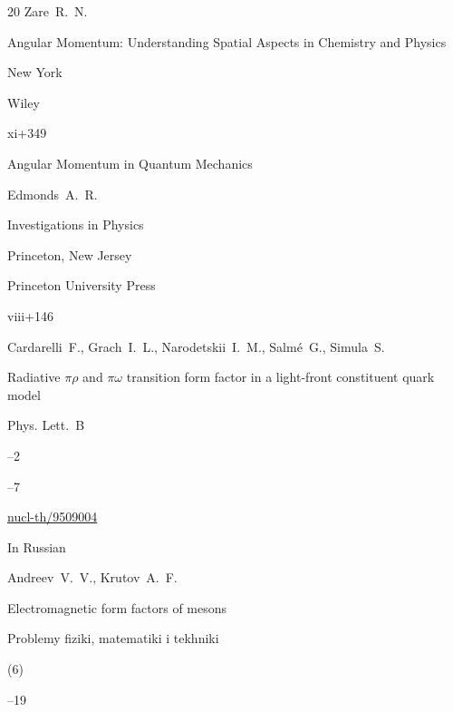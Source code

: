 \begin{thebibliography}{20}
\by Zare~R.~N.

\book Angular Momentum: Understanding Spatial Aspects in Chemistry and Physics

\publaddr New York

\publ Wiley


\totalpages xi+349




\book  Angular Momentum in Quantum Mechanics


\by Edmonds~A.~R.


\serial Investigations in Physics

\publaddr  Princeton, New Jersey

\publ Princeton University Press 

\totalpages viii+146 





\by  Cardarelli~F., Grach~I.~L., Narodetskii~I.~M., Salm\'e~G., Simula~S.

\paper    Radiative $\pi\rho$ and $\pi\omega$ transition form factor in a light-front constituent quark model

\jour Phys. Lett.~B



--2

--7


\arxiv \href{http://arxiv.org/abs/nucl-th/9509004}{nucl-th/9509004}




\lang In Russian

\by  Andreev~V.~V., Krutov~A.~F.

\paper    Electromagnetic form factors of mesons

\jour Problemy fiziki, matematiki i tekhniki


(6)

--19







\end{thebibliography}
